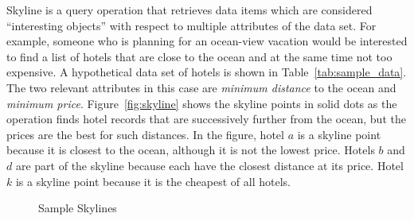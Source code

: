 
Skyline is a query operation that retrieves data items which are
considered ``interesting objects'' with respect to multiple
attributes of the data set. For example, someone who is planning
for an ocean-view vacation would be interested to find a list of
hotels that are close to the ocean and at the same time not too
expensive. A hypothetical data set of hotels is shown in
Table~\ref{tab:sample_data}. The two relevant attributes in this
case are \emph{minimum distance} to the ocean and \emph{minimum
price}. Figure~\ref{fig:skyline} shows the skyline points in solid
dots as the operation finds hotel records that are successively
further from the ocean, but the prices are the best for such
distances. In the figure, hotel $a$ is a skyline point because it
is closest to the ocean, although it is not the lowest price.
Hotels $b$ and $d$ are part of the skyline because each have the
closest distance at its price. Hotel $k$ is a skyline point
because it is the cheapest of all hotels.

\begin{figure}[h]
\centering {}  \caption{Sample Skylines}
\end{figure}

